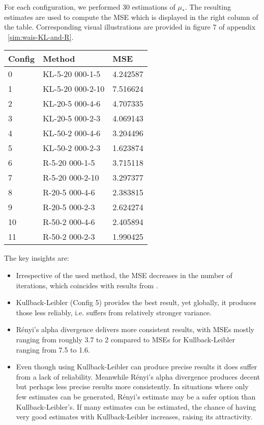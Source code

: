 For each configuration, we performed 30 estimations of $\mu_*$. 
The resulting estimates are used to compute the MSE which is displayed in the right column of the table. Corresponding visual illustrations are provided in figure 7 of appendix ~\ref{sim:wais-KL-and-R}.


\bigskip
\begin{tabular}{lll}
\toprule
{Config} &           \textbf{Method} &      \textbf{MSE} \\
\midrule
0  &   KL-5-20 000-1-5 &  4.242587 \\
1  &  KL-5-20 000-2-10 &  7.516624 \\
2  &   KL-20-5 000-4-6 &  4.707335 \\
3  &   KL-20-5 000-2-3 &  4.069143 \\
4  &   KL-50-2 000-4-6 &  3.204496 \\
5  &   KL-50-2 000-2-3 &  1.623874 \\
6  &    R-5-20 000-1-5 &  3.715118 \\
7  &   R-5-20 000-2-10 &  3.297377 \\
8  &    R-20-5 000-4-6 &  2.383815 \\
9  &    R-20-5 000-2-3 &  2.624274 \\
10 &    R-50-2 000-4-6 &  2.405894 \\
11 &    R-50-2 000-2-3 &  1.990425 \\
\bottomrule
\end{tabular}

The key insights are:
\begin{itemize}
    \item Irrespective of the used method, the MSE decreases in the number of iterations, which coincides with results from \cite{portierdelyonWAIS}.
    \item Kullback-Leibler (Config 5) provides the best result, yet globally, it produces those less reliably, i.e. suffers from relatively stronger variance.
    \item Rényi's alpha divergence delivers more consistent results, with MSEs mostly ranging from roughly 3.7 to 2 compared to MSEs for Kullback-Leibler ranging from 7.5 to 1.6.
    \item Even though using Kullback-Leibler can produce precise results it does suffer from a lack of reliability. Meanwhile Rényi's alpha divergence produces decent but perhaps less precise results more consistently. In situations where only few estimates can be generated, Rényi's estimate may be a safer option than Kullback-Leibler's. If many estimates can be estimated, the chance of having very good estimates with Kullback-Leibler increases, raising its attractivity. 
\end{itemize}

\largeskip

\largeskip

\pagebreak
